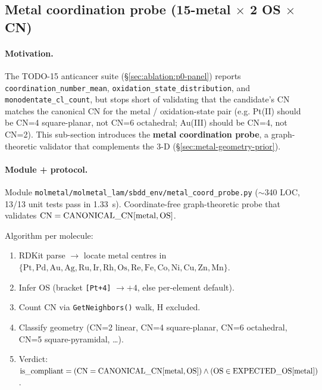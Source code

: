 
\subsection{Metal coordination probe (15-metal $\times$ 2 OS $\times$ CN)}
\label{sec:ablation:metal-coord-probe}

\paragraph{Motivation.}
The TODO-15 anticancer suite (§\ref{sec:ablation:p0-panel}) reports
\texttt{coordination\_number\_mean},
\texttt{oxidation\_state\_distribution}, and
\texttt{monodentate\_cl\_count}, but stops short of validating
that the candidate's CN matches the canonical CN for the metal /
oxidation-state pair (e.g. Pt(II) should be CN=4 square-planar,
not CN=6 octahedral; Au(III) should be CN=4, not CN=2).  This
sub-section introduces the \textbf{metal coordination probe}, a
graph-theoretic validator that complements the 3-D
\mgp{} (\S\ref{sec:metal-geometry-prior}).

\paragraph{Module + protocol.}
Module \texttt{molmetal/molmetal\_lam/sbdd\_env/metal\_coord\_probe.py}
($\sim$340 LOC, 13/13 unit tests pass in 1.33~s).  Coordinate-free
graph-theoretic probe that validates
$\mathrm{CN} = \mathrm{CANONICAL\_CN}[{\rm metal, OS}]$.

Algorithm per molecule:
\begin{enumerate}
  \item RDKit parse $\to$ locate metal centres in
        $\{\mathrm{Pt, Pd, Au, Ag, Ru, Ir, Rh, Os, Re, Fe, Co,
        Ni, Cu, Zn, Mn}\}$.
  \item Infer OS (bracket \texttt{[Pt+4]} $\to +4$, else
        per-element default).
  \item Count CN via \texttt{GetNeighbors()} walk, H excluded.
  \item Classify geometry (CN=2 linear, CN=4 square-planar,
        CN=6 octahedral, CN=5 square-pyramidal, \dots).
  \item Verdict:
        $\mathrm{is\_compliant} = (\mathrm{CN} = \mathrm{CANONICAL\_CN}[{\rm metal, OS}]) \wedge (\mathrm{OS} \in \mathrm{EXPECTED\_OS}[{\rm metal}])$.
\end{enumerate}

